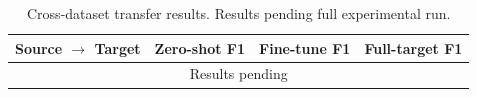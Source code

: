 \begin{table}[t]
\centering
\caption{Cross-dataset transfer results. Results pending full experimental run.}
\label{tab:transfer}
\begin{tabular}{lrrr}
\toprule
Source $\to$ Target & Zero-shot F1 & Fine-tune F1 & Full-target F1 \\
\midrule
\multicolumn{4}{c}{Results pending} \\
\bottomrule
\end{tabular}
\end{table}
